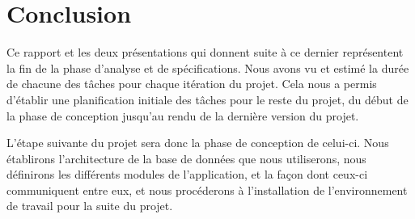 \section{Conclusion}
\label{sec:conclusion}
	
	Ce rapport et les deux présentations qui donnent suite à ce dernier représentent la fin de la phase d'analyse et de spécifications. Nous avons vu et estimé la durée de chacune des tâches pour chaque itération du projet. Cela nous a permis d'établir une planification initiale des tâches pour le reste du projet, du début de la phase de conception jusqu'au rendu de la dernière version du projet.

	L'étape suivante du projet sera donc la phase de conception de celui-ci. Nous établirons l'architecture de la base de données que nous utiliserons, nous définirons les différents modules de l'application, et la façon dont ceux-ci communiquent entre eux, et nous procéderons à l'installation de l'environnement de travail pour la suite du projet.